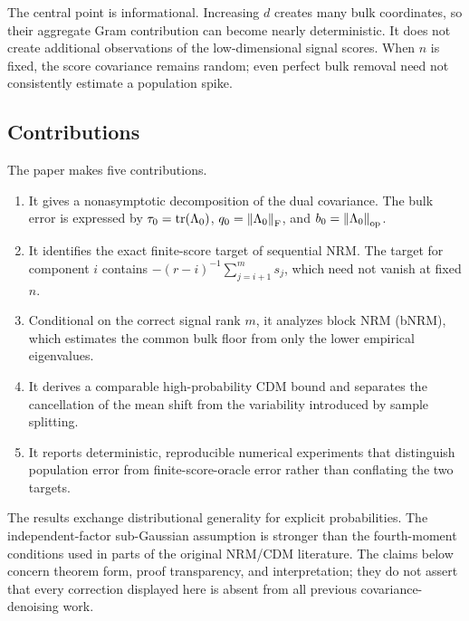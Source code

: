 The central point is informational.  Increasing $d$ creates many bulk coordinates, so their aggregate Gram contribution can become nearly deterministic.  It does not create additional observations of the low-dimensional signal scores.  When $n$ is fixed, the score covariance remains random; even perfect bulk removal need not consistently estimate a population spike.

\subsection{Contributions}
The paper makes five contributions.
\begin{enumerate}
\item It gives a nonasymptotic decomposition of the dual covariance.  The bulk error is expressed by $\tau_0=\operatorname{tr}(\Lambda_0)$, $q_0=\left\lVert\Lambda_0\right\rVert_{\mathrm{F}}$, and $b_0=\left\lVert\Lambda_0\right\rVert_{\mathrm{op}}$.
\item It identifies the exact finite-score target of sequential NRM.  The target for component $i$ contains $-(r-i)^{-1}\sum_{j=i+1}^m s_j$, which need not vanish at fixed $n$.
\item Conditional on the correct signal rank $m$, it analyzes block NRM (bNRM), which estimates the common bulk floor from only the lower empirical eigenvalues.
\item It derives a comparable high-probability CDM bound and separates the cancellation of the mean shift from the variability introduced by sample splitting.
\item It reports deterministic, reproducible numerical experiments that distinguish population error from finite-score-oracle error rather than conflating the two targets.
\end{enumerate}

The results exchange distributional generality for explicit probabilities.  The independent-factor sub-Gaussian assumption is stronger than the fourth-moment conditions used in parts of the original NRM/CDM literature.  The claims below concern theorem form, proof transparency, and interpretation; they do not assert that every correction displayed here is absent from all previous covariance-denoising work.
